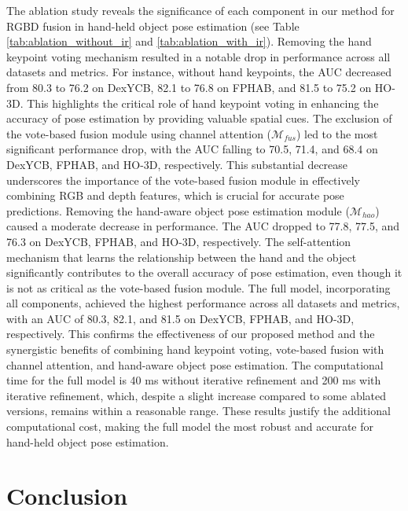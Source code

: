 The ablation study reveals the significance of each component in our method for RGBD fusion in hand-held object pose estimation (see Table \ref{tab:ablation_without_ir} and \ref{tab:ablation_with_ir}). Removing the hand keypoint voting mechanism resulted in a notable drop in performance across all datasets and metrics. For instance, without hand keypoints, the AUC decreased from 80.3 to 76.2 on DexYCB, 82.1 to 76.8 on FPHAB, and 81.5 to 75.2 on HO-3D. This highlights the critical role of hand keypoint voting in enhancing the accuracy of pose estimation by providing valuable spatial cues. The exclusion of the vote-based fusion module using channel attention ($\mathcal{M}_{fus}$) led to the most significant performance drop, with the AUC falling to 70.5, 71.4, and 68.4 on DexYCB, FPHAB, and HO-3D, respectively. This substantial decrease underscores the importance of the vote-based fusion module in effectively combining RGB and depth features, which is crucial for accurate pose predictions. Removing the hand-aware object pose estimation module ($\mathcal{M}_{hao}$) caused a moderate decrease in performance. The AUC dropped to 77.8, 77.5, and 76.3 on DexYCB, FPHAB, and HO-3D, respectively. The self-attention mechanism that learns the relationship between the hand and the object significantly contributes to the overall accuracy of pose estimation, even though it is not as critical as the vote-based fusion module. The full model, incorporating all components, achieved the highest performance across all datasets and metrics, with an AUC of 80.3, 82.1, and 81.5 on DexYCB, FPHAB, and HO-3D, respectively. This confirms the effectiveness of our proposed method and the synergistic benefits of combining hand keypoint voting, vote-based fusion with channel attention, and hand-aware object pose estimation. The computational time for the full model is 40 ms without iterative refinement and 200 ms with iterative refinement, which, despite a slight increase compared to some ablated versions, remains within a reasonable range. These results justify the additional computational cost, making the full model the most robust and accurate for hand-held object pose estimation.

\section{Conclusion}

